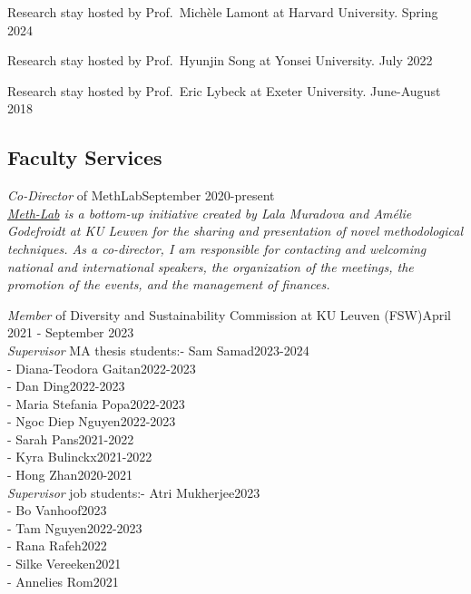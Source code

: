 \documentclass[12pt,]{article}
\begin{document}
Research stay hosted by Prof.~Michèle Lamont at Harvard University.
\hfill \begingroup\small Spring 2024\endgroup

Research stay hosted by Prof.~Hyunjin Song at Yonsei University.
\hfill \begingroup\small July 2022\endgroup

Research stay hosted by Prof.~Eric Lybeck at Exeter University.
\hfill \begingroup\small June-August 2018\endgroup

\hypertarget{faculty-services}{%
\subsection{Faculty Services}\label{faculty-services}}

\emph{Co-Director} of MethLab\hfill \begingroup\small September
2020-present\endgroup\\
\emph{\href{https://soc.kuleuven.be/fsw/doctoralprogramme/meth-lab}{Meth-Lab}
is a bottom-up initiative created by Lala Muradova and Amélie Godefroidt
at KU Leuven for the sharing and presentation of novel methodological
techniques. As a co-director, I am responsible for contacting and
welcoming national and international speakers, the organization of the
meetings, the promotion of the events, and the management of finances.}

\emph{Member} of Diversity and Sustainability Commission at KU Leuven
(FSW)\hfill \begingroup\small April 2021 - September 2023\endgroup\\

\emph{Supervisor} MA thesis students:\newline - Sam
Samad\hfill \begingroup\small 2023-2024\endgroup\\
- Diana-Teodora Gaitan\hfill \begingroup\small 2022-2023\endgroup\\
- Dan Ding\hfill \begingroup\small 2022-2023\endgroup\\
- Maria Stefania Popa\hfill \begingroup\small 2022-2023\endgroup\\
- Ngoc Diep Nguyen\hfill \begingroup\small 2022-2023\endgroup\\
- Sarah Pans\hfill \begingroup\small 2021-2022\endgroup\\
- Kyra Bulinckx\hfill \begingroup\small 2021-2022\endgroup\\
- Hong Zhan\hfill \begingroup\small 2020-2021\endgroup\\

\emph{Supervisor} job students:\newline - Atri
Mukherjee\hfill \begingroup\small 2023\endgroup\\
- Bo Vanhoof\hfill \begingroup\small 2023\endgroup\\
- Tam Nguyen\hfill \begingroup\small 2022-2023\endgroup\\
- Rana Rafeh\hfill \begingroup\small 2022\endgroup\\
- Silke Vereeken\hfill \begingroup\small 2021\endgroup\\
- Annelies Rom\hfill \begingroup\small 2021\endgroup\\
\end{document}
